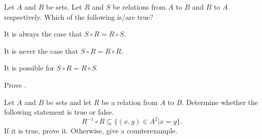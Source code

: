 \begin{exercise}
    Let $A$ and $B$ be sets. Let $R$ and $S$ be relations from $A$ to $B$ and $B$ to $A$ respectively. Which of the following is/are true?
    \begin{partquestions}{\alph*}
        \item It is always the case that $S \circ R = R \circ S$.
        \item It is never the case that $S \circ R = R \circ R$.
        \item It is possible for $S \circ R = R \circ S$.
    \end{partquestions}
\end{exercise}

\begin{exercise}\label{exercise:shoes-and-socks-relations}
    Prove .
\end{exercise}

\begin{exercise}
    Let $A$ and $B$ be sets and let $R$ be a relation from $A$ to $B$. Determine whether the following statement is true or false.
    \[
        R^{-1} \circ R \subseteq \{(x, y) \in A^2 \vert x = y\}.
    \]
    If it is true, prove it. Otherwise, give a counterexample.
\end{exercise}
